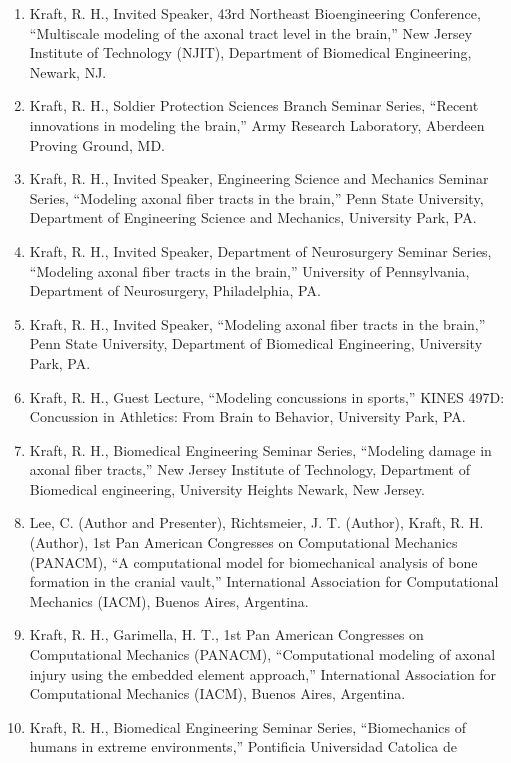 \documentclass[11pt]{article}
\begin{document}
\begin{enumerate}
\item
  Kraft, R. 
H., Invited Speaker, 43rd Northeast Bioengineering
  Conference, ``Multiscale modeling of the axonal tract level in the
  brain,'' New Jersey Institute of Technology (NJIT), Department of
  Biomedical Engineering, Newark, NJ.
\item
  Kraft, R. 
H., Soldier Protection Sciences Branch Seminar Series,
  ``Recent innovations in modeling the brain,'' Army Research Laboratory,
  Aberdeen Proving Ground, MD.
\item
  Kraft, R. 
H., Invited Speaker, Engineering Science and Mechanics
  Seminar Series, ``Modeling axonal fiber tracts in the brain,'' Penn
  State University, Department of Engineering Science and Mechanics,
  University Park, PA.
\item
  Kraft, R. 
H., Invited Speaker, Department of Neurosurgery Seminar
  Series, ``Modeling axonal fiber tracts in the brain,'' University of
  Pennsylvania, Department of Neurosurgery, Philadelphia, PA.
\item
  Kraft, R. 
H., Invited Speaker, ``Modeling axonal fiber tracts in the
  brain,'' Penn State University, Department of Biomedical Engineering,
  University Park, PA.
\item
  Kraft, R. 
H., Guest Lecture, ``Modeling concussions in sports,'' KINES
  497D: Concussion in Athletics: From Brain to Behavior, University
  Park, PA.
\item
  Kraft, R. 
H., Biomedical Engineering Seminar Series, ``Modeling damage
  in axonal fiber tracts,'' New Jersey Institute of Technology,
  Department of Biomedical engineering, University Heights Newark, New
  Jersey.
\item
  Lee, C. 
(Author and Presenter), Richtsmeier, J. 
T. 
(Author), Kraft, R.
  H. 
(Author), 1st Pan American Congresses on Computational Mechanics
  (PANACM), ``A computational model for biomechanical analysis of bone
  formation in the cranial vault,'' International Association for
  Computational Mechanics (IACM), Buenos Aires, Argentina.
\item
  Kraft, R. 
H., Garimella, H. 
T., 1st Pan American Congresses on
  Computational Mechanics (PANACM), ``Computational modeling of axonal
  injury using the embedded element approach,'' International Association
  for Computational Mechanics (IACM), Buenos Aires, Argentina.
\item
  Kraft, R. 
H., Biomedical Engineering Seminar Series, ``Biomechanics of
  humans in extreme environments,'' Pontificia Universidad Catolica de

\end{enumerate}
\end{document}
